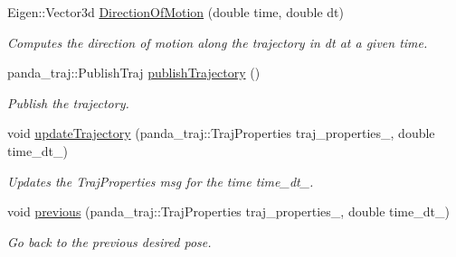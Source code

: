 \begin{DoxyCompactItemize}
Eigen\+::\+Vector3d \hyperlink{class_trajectory_generator_a7414eb6da84136d29805a9c7ee6d857e}{Direction\+Of\+Motion} (double time, double dt)
\begin{DoxyCompactList}\small\item\em Computes the direction of motion along the trajectory in dt at a given time. \end{DoxyCompactList}\item 
\mbox{\label{class_trajectory_generator_a17dbcd81cccde8323949777cd11b315e}} 
panda\+\_\+traj\+::\+Publish\+Traj \hyperlink{class_trajectory_generator_a17dbcd81cccde8323949777cd11b315e}{publish\+Trajectory} ()
\begin{DoxyCompactList}\small\item\em Publish the trajectory. \end{DoxyCompactList}\item 
void \hyperlink{class_trajectory_generator_af27180af44e99c60c5750e8b2444098f}{update\+Trajectory} (panda\+\_\+traj\+::\+Traj\+Properties traj\+\_\+properties\+\_\+, double time\+\_\+dt\+\_\+)
\begin{DoxyCompactList}\small\item\em Updates the Traj\+Properties msg for the time time\+\_\+dt\+\_\+. \end{DoxyCompactList}\item 
void \hyperlink{class_trajectory_generator_aee649f0687ae2ede88f2c6bb97aac7a8}{previous} (panda\+\_\+traj\+::\+Traj\+Properties traj\+\_\+properties\+\_\+, double time\+\_\+dt\+\_\+)
\begin{DoxyCompactList}\small\item\em Go back to the previous desired pose. \end{DoxyCompactList}\end{DoxyCompactItemize}
